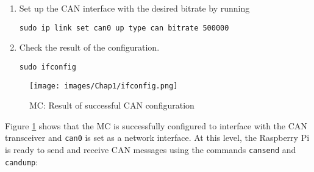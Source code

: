 \begin{enumerate}
    \begin{adjustwidth}{2em}{0pt}
    \begin{lstlisting}[backgroundcolor=\color{mygray}]
    sudo reboot
    \end{lstlisting}
    \captionsetup{type=lstlisting}
    \label{lst:reboot RPi}
    \end{adjustwidth}
    
    \item Set up the CAN interface with the desired bitrate by running 
    \begin{adjustwidth}{2em}{0pt}
    \begin{lstlisting}[backgroundcolor=\color{mygray}]
    sudo ip link set can0 up type can bitrate 500000    
    \end{lstlisting}
    \captionsetup{type=lstlisting}
    \label{lst:config can}
    \end{adjustwidth}
    
    \item Check the result of the configuration.

    \begin{adjustwidth}{2em}{0pt}
    \begin{lstlisting}[backgroundcolor=\color{mygray}]
    sudo ifconfig         
    \end{lstlisting}
    \captionsetup{type=lstlisting}
    \label{lst:ifconfig}
    \end{adjustwidth}
    
\end{enumerate}

\begin{figure}[H]
\begin{center}
\texttt{[image: images/Chap1/ifconfig.png]}\\
\caption{MC: Result of successful CAN configuration}
\label{ifconfig}
\end{center}
\end{figure}

\begin{sloppypar}
Figure \ref{ifconfig} shows that the MC is successfully configured to interface with the CAN transceiver and \texttt{can0} is set as a network interface. At this level, the Raspberry Pi is ready to send and receive CAN messages using the commands \texttt{cansend} and \texttt{candump}:
\end{sloppypar}


